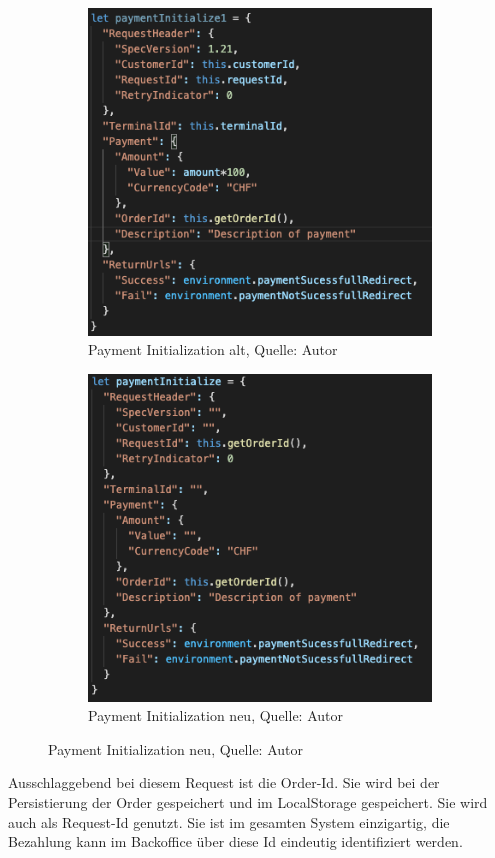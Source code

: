 \begin{figure}[H]
	\begin{subfigure}[b]{0.5\textwidth}
		\includegraphics[scale=0.5]{images/paymentOld.PNG}
		\caption[Payment Initialization alt]{Payment Initialization alt, Quelle: Autor}
		\label{img: requestOld}
	\end{subfigure}
	\hfill
	\begin{subfigure}[b]{0.5\textwidth}
		\includegraphics[scale=0.5]{images/paymentNew.PNG}
		\caption[Payment Initialization neu]{Payment Initialization neu, Quelle: Autor}
		\label{img: requestNew}
	\end{subfigure}
\end{figure} 
Ausschlaggebend bei diesem Request ist die Order-Id. Sie wird bei der Persistierung der Order gespeichert und im \gls{LocalStorage} gespeichert. Sie wird auch als Request-Id genutzt. Sie ist im gesamten System einzigartig, die Bezahlung kann im Backoffice über diese Id eindeutig identifiziert werden. \\
